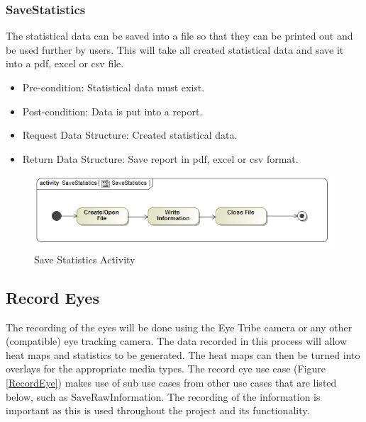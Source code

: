 		\subsubsection{SaveStatistics}
The statistical data can be saved into a file so that they can be printed out and be used further by users. This will take all created statistical data and save it into a pdf, excel or csv file.
\begin{itemize}
\item Pre-condition: Statistical data must exist.
\item Post-condition: Data is put into a report.
\item Request Data Structure: Created statistical data.
\item Return Data Structure: Save report in pdf, excel or csv format.
\end{itemize}

\begin{figure}[!ht]
	\centering
	\includegraphics[scale=0.5]{Diagrams/Activity_Diagram__SaveStatistics__SaveStatistics.png}
	\caption{Save Statistics Activity}
	\end{figure}
	
\subsection{Record Eyes}
The recording of the eyes will be done using the Eye Tribe camera or any other (compatible) eye tracking camera. The data recorded in this process will allow heat maps and statistics to be generated. The heat maps can then be turned into overlays for the appropriate media types. The record eye use case (Figure \ref{RecordEye}) makes use of sub use cases from other use cases that are listed below, such as SaveRawInformation. The recording of the information is important as this is used throughout the project and its functionality.
\newline

